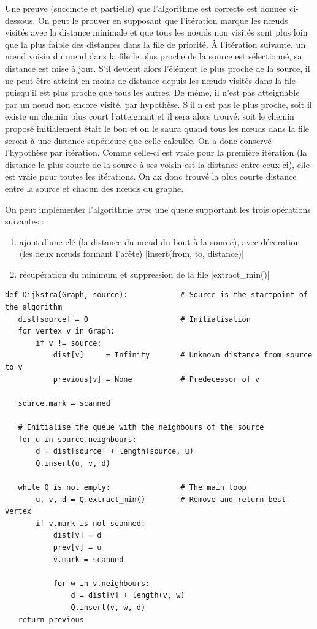 \documentclass{article}
\begin{document}
Une preuve (succincte et partielle) que l'algorithme est correcte est
donnée ci-dessous. On peut le prouver en supposant que
l'itération marque les nœuds visités avec la distance minimale et que
tous les nœuds non visités sont plus loin que la plus faible des
distances dans la file de priorité.
À l'itération suivante, un nœud voisin du nœud dans la file le plus
proche de la source est sélectionné, sa distance est mise à jour. S'il
devient alors l'élément le plus proche de la source, il ne peut être
atteint en moins de distance depuis les nœuds visités dans la file
puisqu'il est plus proche que tous les autres. De même, il n'est pas
atteignable par un nœud non encore visité, par hypothèse. S'il n'est
pas le plus proche, soit il existe un chemin plus court l'atteignant
et il sera alors trouvé, soit le chemin proposé initialement était le
bon et on le saura quand tous les nœuds dans la file seront à une
distance supérieure que celle calculée. On a donc conservé l'hypothèse
par itération.
Comme celle-ci est vraie pour la première itération (la distance la
plus courte de la source à ses voisin est la distance entre ceux-ci),
elle est vraie pour toutes les itérations. On ax donc trouvé la plus
courte distance entre la source et chacun des nœuds du graphe.

On peut implémenter l'algorithme avec une queue supportant les trois
opérations suivantes :
\begin{enumerate}
  \item ajout d'une clé (la distance du nœud du bout à la source), avec
    décoration (les deux nœuds formant l'arête) 
    |insert(from, to, distance)|
  \item récupération du minimum et suppression de la file
    |extract_min()|
\end{enumerate}
\begin{verbatim}
def Dijkstra(Graph, source):            # Source is the startpoint of the algorithm
   dist[source] = 0                     # Initialisation
   for vertex v in Graph:
       if v != source:
           dist[v]     = Infinity       # Unknown distance from source to v
           previous[v] = None           # Predecessor of v

   source.mark = scanned

   # Initialise the queue with the neighbours of the source
   for u in source.neighbours:
       d = dist[source] + length(source, u)
       Q.insert(u, v, d)

   while Q is not empty:                # The main loop
       u, v, d = Q.extract_min()        # Remove and return best vertex
       if v.mark is not scanned:
           dist[v] = d
           prev[v] = u
           v.mark = scanned

           for w in v.neighbours: 
               d = dist[v] + length(v, w) 
               Q.insert(v, w, d)
   return previous
\end{verbatim}
\end{document}
